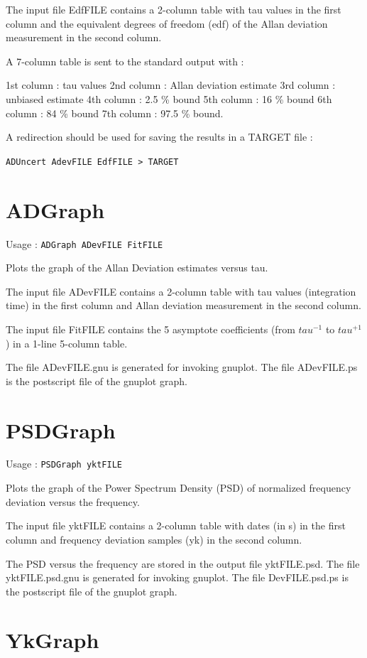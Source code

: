 \documentclass[10pt,a4paper,french]{article}
\begin{document}
The input file EdfFILE contains a 2-column table with tau values in the first column and the equivalent degrees of freedom (edf) of the Allan deviation measurement in the second column.

A 7-column table is sent to the standard output with :

    1st column : tau values
    2nd column : Allan deviation estimate
    3rd column : unbiased estimate
    4th column : 2.5 \% bound
    5th column : 16 \% bound
    6th column : 84 \% bound
    7th column : 97.5 \% bound.

A redirection should be used for saving the results in a TARGET file : 

{\tt{ADUncert AdevFILE EdfFILE > TARGET}

\section{ADGraph}

Usage : {\tt{ADGraph ADevFILE FitFILE}}

Plots the graph of the Allan Deviation estimates versus tau.

The input file ADevFILE contains a 2-column table with tau values (integration time) in the first column and Allan deviation measurement in the second column.

The input file FitFILE contains the 5 asymptote coefficients (from $tau^{-1}$ to $tau^{+1}$) in a 1-line 5-column table.

The file ADevFILE.gnu is generated for invoking gnuplot.
The file ADevFILE.ps is the postscript file of the gnuplot graph.

\section{PSDGraph}

Usage : {\tt{PSDGraph yktFILE}}

Plots the graph of the Power Spectrum Density (PSD) of normalized frequency deviation versus the frequency.

The input file yktFILE contains a 2-column table with dates (in s) in the first column and frequency deviation samples (yk) in the second column.

The PSD versus the frequency are stored in the output file yktFILE.psd.
The file yktFILE.psd.gnu is generated for invoking gnuplot.
The file DevFILE.psd.ps is the postscript file of the gnuplot graph.

\section{YkGraph}

}
\end{document}
